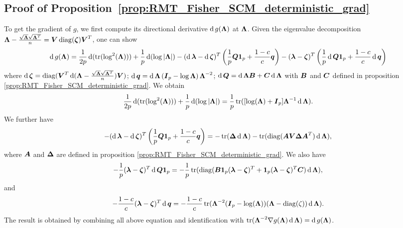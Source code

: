 \subsection{Proof of Proposition~\ref{prop:RMT_Fisher_SCM_deterministic_grad}}

To get the gradient of $g$, we first compute its directional derivative $\diff g(\MAT{\Lambda})$ at $\eigsMat$.
Given the eigenvalue decomposition $\eigsMat - \frac{\sqrt{\VEC{\Lambda}}\sqrt{\VEC{\Lambda}^T}}{\nsamples}=\MAT{V}\diag(\VEC{\zeta})\MAT{V}^T$, one can show
\begin{equation*}
    \diff g(\MAT{\Lambda}) = \frac{1}{2p} \diff (\tr(\log^2(\MAT{\Lambda}))) + \frac{1}{p} \diff (\log|\MAT{\Lambda}|) - (\diff \VEC{\lambda}-\diff \VEC{\zeta})^T\left( \frac{1}{p} \MAT{Q}\onevec +\frac{1-c}{c} \VEC{q} \right) - (\VEC{\lambda}-\VEC{\zeta})^T\left( \frac{1}{p} \diff\MAT{Q}\onevec
+\frac{1-c}{c} \diff\VEC{q} \right)
\end{equation*}
where
$\diff\VEC{\zeta}=\diag(\MAT{V}^T\diff(\eigsMat - \frac{\sqrt{\VEC{\Lambda}}\sqrt{\VEC{\Lambda}^T}}{\nsamples})\MAT{V})$;
$\diff\VEC{q} = \diff \MAT{\Lambda} \left( \MAT{I}_p -\log \MAT{\Lambda} \right)\MAT{\Lambda}^{-2}$; 
$\diff \MAT{Q} = \diff \MAT{\Lambda} \MAT{B} + \MAT{C} \diff \MAT{\Lambda}$ with $\MAT{B}$ and $\MAT{C}$ defined in proposition \ref{prop:RMT_Fisher_SCM_deterministic_grad}.
We obtain
$$
    \frac{1}{2p} \diff (\tr(\log^2(\MAT{\Lambda}))) + \frac{1}{p} \diff (\log|\MAT{\Lambda}|)
    =
    \frac1p\tr([\log(\eigsMat)+\eye]\eigsMat^{-1}\diff\eigsMat).
$$
We further have
$$
    - (\diff \VEC{\lambda}-\diff \VEC{\zeta})^T\left( \frac{1}{p} \MAT{Q}\onevec +\frac{1-c}{c} \VEC{q} \right) = -\tr(\MAT{\Delta}\diff\eigsMat) - \tr(\diag(\MAT{A}\MAT{V}\MAT{\Delta}\MAT{A}^T)\diff\eigsMat),
$$
where $\MAT{A}$ and $\MAT{\Delta}$ are defined in proposition \ref{prop:RMT_Fisher_SCM_deterministic_grad}.
We also have
$$
    - \frac{1}{p}(\VEC{\lambda}-\VEC{\zeta})^T\diff\MAT{Q}\onevec
    = -\frac1p\tr(\diag(\MAT{B}\onevec(\VEC{\lambda}-\VEC{\zeta})^T + \onevec(\VEC{\lambda}-\VEC{\zeta})^T\MAT{C})\diff\eigsMat),
$$
and
$$
    -\frac{1-c}{c}(\VEC{\lambda}-\VEC{\zeta})^T\diff\VEC{q}
    = -\frac{1-c}{c}\tr(\eigsMat^{-2}(\eye-\log(\eigsMat))(\eigsMat-\diag(\zeta))\diff\eigsMat).
$$
The result is obtained by combining all above equation and identification with $\tr(\eigsMat^{-2}\grad g(\eigsMat)\diff\eigsMat) = \diff g(\MAT{\Lambda})$.






